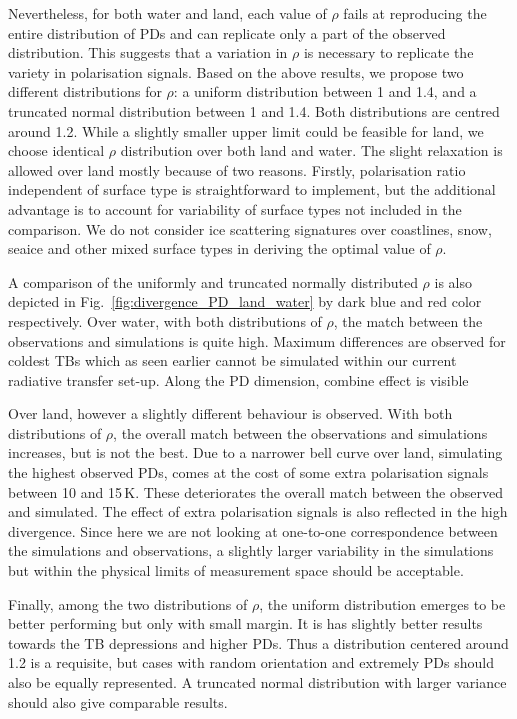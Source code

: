 \documentclass[amt, manuscript]{copernicus}
\begin{document}
Nevertheless, for both water and land, each value of $\rho$ fails at reproducing the entire distribution of PDs and can replicate only a part of the observed distribution. This suggests that a variation in $\rho$ is necessary to replicate the variety in polarisation signals. Based on the above results, we propose two different distributions for $\rho$: a uniform distribution between 1 and 1.4, and a truncated normal distribution between 1 and 1.4. Both distributions are centred around 1.2. While a slightly smaller upper limit could be feasible for land, we choose identical $\rho$ distribution over both land and water. The slight relaxation is allowed over land mostly because of two reasons. Firstly, polarisation ratio independent of surface type is straightforward to implement, but the additional advantage is to account for variability of surface types not included in the comparison. We do not consider ice scattering signatures over coastlines, snow, seaice and other mixed surface types in deriving the optimal value of $\rho$. 

A comparison of the uniformly and truncated normally distributed $\rho$ is also depicted in Fig.~\ref{fig:divergence_PD_land_water} by dark blue and red color respectively. Over water, with both distributions of $\rho$, the match between the observations and simulations is quite high. Maximum differences are observed for coldest TBs which as seen earlier cannot be simulated within our current radiative transfer set-up. Along the PD dimension, combine effect is visible 

Over land, however a slightly different behaviour is observed. With both distributions of $\rho$, the overall match between the observations and simulations increases, but is not the best. Due to a narrower bell curve over land, simulating the highest observed PDs, comes at the cost of some extra polarisation signals between 10 and 15\,K. These deteriorates the overall match between the observed and simulated. The effect of extra polarisation signals is also reflected in the high divergence. Since here we are not looking at one-to-one correspondence between the simulations and observations, a slightly larger variability in the simulations but within the physical limits of measurement space should be acceptable.

Finally, among the two distributions of $\rho$, the uniform distribution emerges to be better performing but only with small margin. It is has slightly better results towards the TB depressions and higher PDs. Thus a distribution centered around 1.2 is a requisite, but cases with random orientation and extremely PDs should also be equally represented. A truncated normal distribution with larger variance should also give comparable results. 
\end{document}
